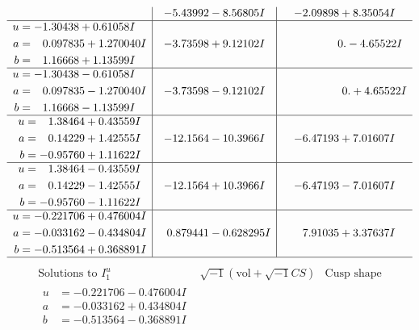 \documentclass[1p]{elsarticle_modified}
\theoremstyle{definition}
\newcommand{\I}{\sqrt{-1}}
\begin{document}
$$\begin{array}{c|c|c}
 & -5.43992 - 8.56805 I & -2.09898 + 8.35054 I \\ \hline\begin{aligned}
u &= -1.30438 + 0.61058 I \\
a &= \phantom{-}0.097835 + 1.270040 I \\
b &= \phantom{-}1.16668 + 1.13599 I\end{aligned}
 & -3.73598 + 9.12102 I & \phantom{-0.000000 } 0. - 4.65522 I \\ \hline\begin{aligned}
u &= -1.30438 - 0.61058 I \\
a &= \phantom{-}0.097835 - 1.270040 I \\
b &= \phantom{-}1.16668 - 1.13599 I\end{aligned}
 & -3.73598 - 9.12102 I & \phantom{-0.000000 -}0. + 4.65522 I \\ \hline\begin{aligned}
u &= \phantom{-}1.38464 + 0.43559 I \\
a &= \phantom{-}0.14229 + 1.42555 I \\
b &= -0.95760 + 1.11622 I\end{aligned}
 & -12.1564 - 10.3966 I & -6.47193 + 7.01607 I \\ \hline\begin{aligned}
u &= \phantom{-}1.38464 - 0.43559 I \\
a &= \phantom{-}0.14229 - 1.42555 I \\
b &= -0.95760 - 1.11622 I\end{aligned}
 & -12.1564 + 10.3966 I & -6.47193 - 7.01607 I \\ \hline\begin{aligned}
u &= -0.221706 + 0.476004 I \\
a &= -0.033162 - 0.434804 I \\
b &= -0.513564 + 0.368891 I\end{aligned}
 & \phantom{-}0.879441 - 0.628295 I & \phantom{-}7.91035 + 3.37637 I\\
 \hline 
 \end{array}$$\newpage$$\begin{array}{c|c|c}  
\text{Solutions to }I^u_{1}& \I (\text{vol} + \sqrt{-1}CS) & \text{Cusp shape}\\
 \hline 
\begin{aligned}
u &= -0.221706 - 0.476004 I \\
a &= -0.033162 + 0.434804 I \\
b &= -0.513564 - 0.368891 I\end{aligned}

\end{array}$$
\end{document}
